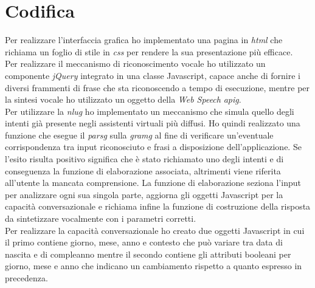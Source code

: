 \section{Codifica}
Per realizzare l'interfaccia grafica ho implementato una pagina in \emph{\gls{html}} che richiama un foglio di stile in \emph{\gls{css}} per rendere la sua presentazione più efficace. \\
Per realizzare il meccanismo di riconoscimento vocale ho utilizzato un componente \emph{jQuery} integrato in una classe Javascript, capace anche di fornire i diversi frammenti di frase che sta riconoscendo a tempo di esecuzione, mentre per la sintesi vocale ho utilizzato un oggetto della \emph{Web Speech} \emph{\gls{apig}}. \\
Per utilizzare la \emph{\gls{nlug}} ho implementato un meccanismo che simula quello degli intenti già presente negli assistenti virtuali più diffusi. Ho quindi realizzato una funzione che esegue il \emph{\gls{parsg}} sulla \emph{\gls{gramg}} al fine di verificare un'eventuale corrispondenza tra input riconosciuto e frasi a disposizione dell'applicazione. Se l'esito risulta positivo significa che è stato richiamato uno degli intenti e di conseguenza la funzione di elaborazione associata, altrimenti viene riferita all'utente la mancata comprensione. La funzione di elaborazione seziona l'input per analizzare ogni sua singola parte, aggiorna gli oggetti Javascript per la capacità conversazionale e richiama infine la funzione di costruzione della risposta da sintetizzare vocalmente con i parametri corretti. \\
Per realizzare la capacità conversazionale ho creato due oggetti Javascript in cui il primo contiene giorno, mese, anno e contesto che può variare tra data di nascita e di compleanno mentre il secondo contiene gli attributi booleani per giorno, mese e anno che indicano un cambiamento rispetto a quanto espresso in precedenza.
